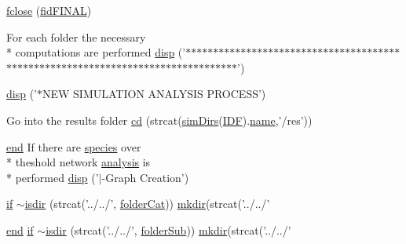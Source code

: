 \begin{DoxyCompactItemize}
\item 
\hyperlink{a00028_a59d5e4adb82333e9d1fbe886d0071c6b}{fclose} (\hyperlink{a00028_a2f1bf22f6a0c3f5791577061e92c0433}{fid\+F\+I\+N\+A\+L})
\item 
For each folder the necessary \\*
computations are performed \hyperlink{a00028_a2ec4cc6a83a1e0bbf63967d936f47a80}{disp} ('$\ast$$\ast$$\ast$$\ast$$\ast$$\ast$$\ast$$\ast$$\ast$$\ast$$\ast$$\ast$$\ast$$\ast$$\ast$$\ast$$\ast$$\ast$$\ast$$\ast$$\ast$$\ast$$\ast$$\ast$$\ast$$\ast$$\ast$$\ast$$\ast$$\ast$$\ast$$\ast$$\ast$$\ast$$\ast$$\ast$$\ast$$\ast$$\ast$$\ast$$\ast$$\ast$$\ast$$\ast$$\ast$$\ast$$\ast$$\ast$$\ast$$\ast$$\ast$$\ast$$\ast$$\ast$$\ast$$\ast$$\ast$$\ast$$\ast$$\ast$$\ast$$\ast$$\ast$$\ast$$\ast$$\ast$$\ast$$\ast$$\ast$$\ast$$\ast$$\ast$$\ast$$\ast$$\ast$$\ast$$\ast$$\ast$$\ast$$\ast$$\ast$')
\item 
\hyperlink{a00028_a38d178e303e0e03c1ed53965653d0262}{disp} ('$\ast$N\+E\+W S\+I\+M\+U\+L\+A\+T\+I\+O\+N A\+N\+A\+L\+Y\+S\+I\+S P\+R\+O\+C\+E\+S\+S')
\item 
Go into the results folder \hyperlink{a00028_a39434ffa59ddeceeb07714cb934049a9}{cd} (strcat(\hyperlink{a00031_aae5035eb84b89176ed5b06e136325eff}{sim\+Dirs}(\hyperlink{a00028_a8acdc1bee73718b1ffcfc7eb26968f48}{I\+D\+F}).\hyperlink{a00027_abbf559a76fab59203496b0847ab9502a}{name},'/res'))
\item 
\hyperlink{a00025_afb358f48b1646c750fb9da6c6585be2b}{end} If there are \hyperlink{a00021}{species} over \\*
theshold network \hyperlink{a00032_abf6e5638a23a2531114655f3f690b70c}{analysis} is \\*
performed \hyperlink{a00028_a828037c6f20803254b0678bdb129fd8b}{disp} ('$\vert$-\/Graph Creation')
\item 
\hyperlink{a00030_a01d55766b8058903dd360b4bda71f9f5}{if} \hyperlink{a00028_aa2bc434ff78341a81d894075c72eae04}{$\sim$isdir} (strcat('../../', \hyperlink{a00028_ac4793cb55101110d228ded89ce9caa48}{folder\+Cat})) \hyperlink{a00110_ae58a11ed5ac7873b1039a391d5c86a05}{mkdir}(strcat('../../'
\item 
\hyperlink{a00025_afb358f48b1646c750fb9da6c6585be2b}{end} \hyperlink{a00030_a01d55766b8058903dd360b4bda71f9f5}{if} \hyperlink{a00028_a3ec41fbe9b14d88e96ca86873e4e590e}{$\sim$isdir} (strcat('../../', \hyperlink{a00028_a05c5bf0305e5d58d4dc25bd89a025678}{folder\+Sub})) \hyperlink{a00110_ae58a11ed5ac7873b1039a391d5c86a05}{mkdir}(strcat('../../'
\item 

\end{DoxyCompactItemize}
